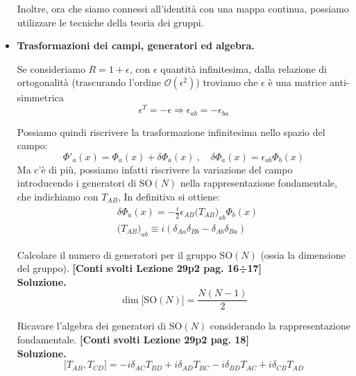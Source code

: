 \documentclass[../main.tex]{subfiles}
\begin{document}
\begin{itemize}
    Inoltre, ora che siamo connessi all'identità con una mappa continua, possiamo utilizzare le tecniche della teoria dei gruppi.

    \item \textbf{Trasformazioni dei campi, generatori ed algebra.}

    Se consideriamo $R=1+\epsilon$, con $\epsilon$ quantità infinitesima, dalla relazione di ortogonalità (trascurando l'ordine $\mathscr O(\epsilon^2)$) troviamo che $\epsilon$ è una matrice anti-simmetrica
    \[
    \epsilon^T=-\epsilon \Rightarrow \boxed{\epsilon_{ab}=-\epsilon_{ba}}
    \]

    Possiamo quindi riscrivere la trasformazione infinitesima nello spazio del campo:
    \[
    \Phi'_a(x) = \Phi_a(x) + \delta \Phi_a(x)~,\quad \delta \Phi_a(x) = \epsilon_{ab} \Phi_b(x)
    \]
    Ma c'è di più, possiamo infatti riscrivere la variazione del campo introducendo i generatori di $\textrm{SO}(N)$ nella rappresentazione fondamentale, che indichiamo con $T_{AB}$, In definitiva si ottiene:
    \[
    \boxed{\begin{aligned}
        &\delta \Phi_a(x) = -\frac{i}{2}\epsilon_{AB}\big(T_{AB}\big)_{ab}\Phi_b(x) \\
        &\big(T_{AB}\big)_{ab} \equiv i(\delta_{Aa}\delta_{Bb} - \delta_{Ab}\delta_{Ba})
    \end{aligned}}
    \]
    \begin{exercise}
        Calcolare il numero di generatori per il gruppo $\textrm{SO}(N)$ (ossia la dimensione del gruppo). \textbf{[Conti svolti Lezione 29p2 pag. 16÷17]}\\

        \textbf{Soluzione. } 
        \[
        \boxed{\dim \big[\textrm{SO}(N)\big] = \frac{N(N-1)}{2}}
        \]
    \end{exercise}
    \begin{exercise}
        Ricavare l'algebra dei generatori di $\textrm{SO}(N)$ considerando la rappresentazione fondamentale. \textbf{[Conti svolti Lezione 29p2 pag. 18]}\\

        \textbf{Soluzione. } 
        \begin{equation}
            \boxed{\big[T_{AB}, T_{CD}\big] = -i\delta_{AC}T_{BD} + i\delta_{AD}T_{BC} - i\delta_{BD}T_{AC} + i\delta_{CB}T_{AD}}
            \label{eq:SO_N_gens_algebra}
        \end{equation}
    \end{exercise}


\end{itemize}
\end{document}
